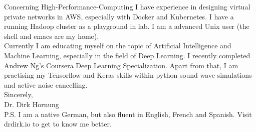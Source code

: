 \documentclass[11pt]{article}
\begin{document}
 \noindent Concerning High-Performance-Computing I have experience in designing
 virtual private networks in AWS, especially with Docker and Kubernetes. I have
 a running Hadoop cluster as a playground in lab. I am a advanced Unix user
 (the shell and emacs are my home). \\

 \noindent Currently I am educating myself on the topic of Artificial Intelligence
 and Machine Learning, especially in the field of Deep Learning. I recently completed
 Andrew Ng's Coursera Deep Learning Specialization. Apart from that, I am practising my
 Tensorflow and Keras skills within python sound wave simulations and active noise cancelling.\\

 \noindent Sincerely, \\
 Dr. Dirk Hornung \\

 \noindent P.S. I am a native German, but also fluent in English, French and
 Spanish. Visit drdirk.io to get to know me better.

 
\end{document}
